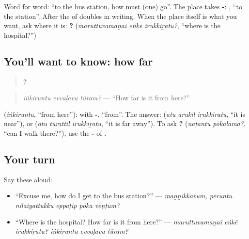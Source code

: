 Word for word: \textquotedblleft{}to the bus station, how must (one) go\textquotedblright{}. The place takes \textbf{-}: \textbf{}, \textquotedblleft{}to the station\textquotedblright{}. After \textbf{} the \textbf{} of \textbf{} doubles in writing. When the place itself is what you want, ask where it is: \textbf{  ?} (\emph{maruttuvamaṉai eṅkē irukkiṟatu?}, \textquotedblleft{}where is the hospital?\textquotedblright{})

\subsection*{You'll want to know: how far}
\begin{quote}
\textbf{  ?}
\end{quote}

\begin{quote}
\emph{iṅkiruntu evvaḷavu tūram?} — \textquotedblleft{}How far is it from here?\textquotedblright{}
\end{quote}

\textbf{} (\emph{iṅkiruntu}, \textquotedblleft{}from here\textquotedblright{}): \textbf{} with \textbf{-}, \textquotedblleft{}from\textquotedblright{}. The answer: \textbf{  } (\emph{atu arukil irukkiṟatu}, \textquotedblleft{}it is near\textquotedblright{}), or \textbf{  } (\emph{atu tūrattil irukkiṟatu}, \textquotedblleft{}it is far away\textquotedblright{}). To ask \textbf{ ?} (\emph{naṭantu pōkalāmā?}, \textquotedblleft{}can I walk there?\textquotedblright{}), use the \textbf{-} of \textbf{}.

\subsection*{Your turn}
Say these aloud:

\begin{itemize}
\raggedright
  \item \textquotedblleft{}Excuse me, how do I get to the bus station?\textquotedblright{} — \emph{maṉṉikkavum, pēruntu nilaiyattukku eppaṭip pōka vēṇṭum?}
  \item \textquotedblleft{}Where is the hospital? How far is it from here?\textquotedblright{} — \emph{maruttuvamaṉai eṅkē irukkiṟatu? iṅkiruntu evvaḷavu tūram?}
\end{itemize}

